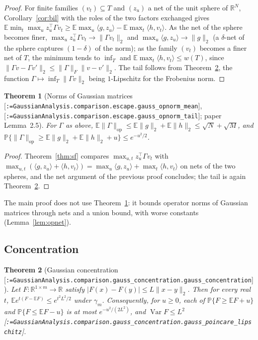 \documentclass[11pt]{article}
\makeatletter
\newcommand{\formal@break}[1]{\@tfor\formal@tok:=#1\do{%
  \formal@tok
  \expandafter\ifx\formal@tok.\allowbreak\else
  \expandafter\ifx\formal@tok\_\allowbreak\fi\fi}}
\DeclareRobustCommand{\formal}[1]{\textnormal{[\texttt{\small\formal@break{#1}}]}}
\newcommand{\R}{\mathbb{R}}
\newcommand{\E}{\mathbb{E}}
\newcommand{\Prob}{\mathbb{P}}
\newcommand{\ip}[2]{\langle #1, #2\rangle}
\newcommand{\norm}[1]{\lVert #1\rVert}
\newcommand{\abs}[1]{\lvert #1\rvert}
\newcommand{\op}{\mathrm{op}}
\newcommand{\Fro}{F}
\newcommand{\gauss}{\gamma}
\theoremstyle{plain}
\newtheorem{theorem}{Theorem}[section]
\theoremstyle{definition}
\makeatother
\begin{document}
\begin{proof}
For finite families $(v_t) \subseteq T$ and $(z_u)$ a net of the unit
sphere of $\R^N$, Corollary~\ref{cor:bil} with the roles of the two factors
exchanged gives
$\E \min_t \max_u z_u^{\top}\Gamma v_t \ge \E \max_u \ip{g}{z_u} - \E \max_t \ip{h}{v_t}$.
As the net of the sphere becomes finer, $\max_u z_u^{\top} \Gamma v_t \to \norm{\Gamma v_t}_2$
and $\max_u \ip{g}{z_u} \to \norm{g}_2$ (a $\delta$-net of the sphere
captures $(1-\delta)$ of the norm); as the family $(v_t)$ becomes a finer
net of $T$, the minimum tends to $\inf_T$ and $\E\max_t \ip{h}{v_t} \le w(T)$,
since $\norm{\Gamma v - \Gamma v'}_2 \le \norm{\Gamma}_\Fro \norm{v - v'}_2$.
The tail follows from Theorem~\ref{thm:conc}, the function
$\Gamma \mapsto \inf_T \norm{\Gamma v}_2$ being $1$-Lipschitz for the
Frobenius norm.
\end{proof}

\begin{theorem}[Norms of Gaussian matrices \formal{GaussianAnalysis.comparison.escape.gauss\_opnorm\_mean}, \formal{GaussianAnalysis.comparison.escape.gauss\_opnorm\_tail}; paper Lemma~2.5]\label{thm:opnorm}
For $\Gamma$ as above, $\E\norm{\Gamma}_\op \le \E\norm{g}_2 + \E\norm{h}_2 \le \sqrt N + \sqrt M$,
and $\Prob\{\norm{\Gamma}_\op \ge \E\norm{g}_2 + \E\norm{h}_2 + u\} \le e^{-u^2/2}$.
\end{theorem}

\begin{proof}
Theorem~\ref{thm:sf} compares $\max_{u,t} z_u^{\top}\Gamma v_t$ with
$\max_{u,t}(\ip{g}{z_u} + \ip{h}{v_t}) = \max_u\ip{g}{z_u} + \max_t \ip{h}{v_t}$
on nets of the two spheres, and the net argument of the previous proof
concludes; the tail is again Theorem~\ref{thm:conc}.
\end{proof}

The main proof does not use Theorem~\ref{thm:opnorm}: it bounds operator
norms of Gaussian matrices through nets and a union bound, with worse
constants (Lemma~\ref{lem:opnet}).

\subsection{Concentration}

\begin{theorem}[Gaussian concentration \formal{GaussianAnalysis.comparison.gauss\_concentration.gauss\_concentration}]\label{thm:conc}
Let $F : \R^{1\times m} \to \R$ satisfy $\abs{F(x) - F(y)} \le L \norm{x - y}_2$.
Then for every real $t$, $\E e^{t(F - \E F)} \le e^{t^2 L^2/2}$ under
$\gauss_m$. Consequently, for $u \ge 0$, each of $\Prob\{F \ge \E F + u\}$
and $\Prob\{F \le \E F - u\}$ is at most $e^{-u^2/(2L^2)}$, and
$\operatorname{Var} F \le L^2$ \formal{GaussianAnalysis.comparison.gauss\_concentration.gauss\_poincare\_lipschitz}.
\end{theorem}
\end{document}
